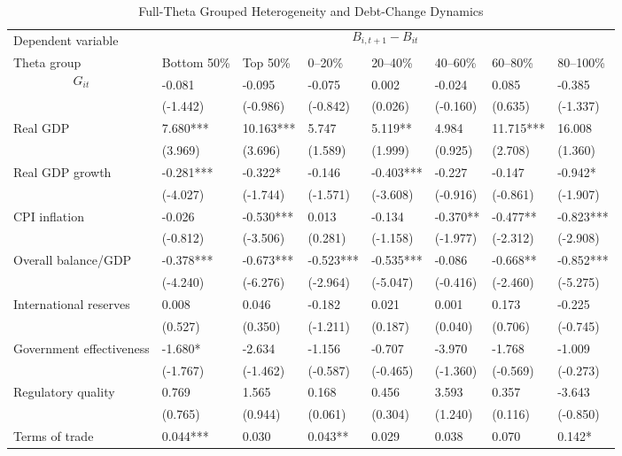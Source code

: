 \begin{table}[H]\centering
\begin{threeparttable}
\caption{Full-Theta Grouped Heterogeneity and Debt-Change Dynamics}
\label{tab:theta_group_heterogeneity_debt}
\scriptsize
\begin{tabularx}{\textwidth}{lYYYYYYY}
\toprule
Dependent variable &  \\
\cmidrule(lr){2-8}
Theta group & Bottom 50\% & Top 50\% & 0--20\% & 20--40\% & 40--60\% & 60--80\% & 80--100\% \\
\midrule
$$G_{it}$$ & -0.081 & -0.095 & -0.075 & 0.002 & -0.024 & 0.085 & -0.385 \\
  & (-1.442) & (-0.986) & (-0.842) & (0.026) & (-0.160) & (0.635) & (-1.337) \\
Real GDP & 7.680*** & 10.163*** & 5.747 & 5.119** & 4.984 & 11.715*** & 16.008 \\
  & (3.969) & (3.696) & (1.589) & (1.999) & (0.925) & (2.708) & (1.360) \\
Real GDP growth & -0.281*** & -0.322* & -0.146 & -0.403*** & -0.227 & -0.147 & -0.942* \\
  & (-4.027) & (-1.744) & (-1.571) & (-3.608) & (-0.916) & (-0.861) & (-1.907) \\
CPI inflation & -0.026 & -0.530*** & 0.013 & -0.134 & -0.370** & -0.477** & -0.823*** \\
  & (-0.812) & (-3.506) & (0.281) & (-1.158) & (-1.977) & (-2.312) & (-2.908) \\
Overall balance/GDP & -0.378*** & -0.673*** & -0.523*** & -0.535*** & -0.086 & -0.668** & -0.852*** \\
  & (-4.240) & (-6.276) & (-2.964) & (-5.047) & (-0.416) & (-2.460) & (-5.275) \\
International reserves & 0.008 & 0.046 & -0.182 & 0.021 & 0.001 & 0.173 & -0.225 \\
  & (0.527) & (0.350) & (-1.211) & (0.187) & (0.040) & (0.706) & (-0.745) \\
Government effectiveness & -1.680* & -2.634 & -1.156 & -0.707 & -3.970 & -1.768 & -1.009 \\
  & (-1.767) & (-1.462) & (-0.587) & (-0.465) & (-1.360) & (-0.569) & (-0.273) \\
Regulatory quality & 0.769 & 1.565 & 0.168 & 0.456 & 3.593 & 0.357 & -3.643 \\
  & (0.765) & (0.944) & (0.061) & (0.304) & (1.240) & (0.116) & (-0.850) \\
Terms of trade & 0.044*** & 0.030 & 0.043** & 0.029 & 0.038 & 0.070 & 0.142* \\

\end{tabularx}
\end{threeparttable}
\end{table}
